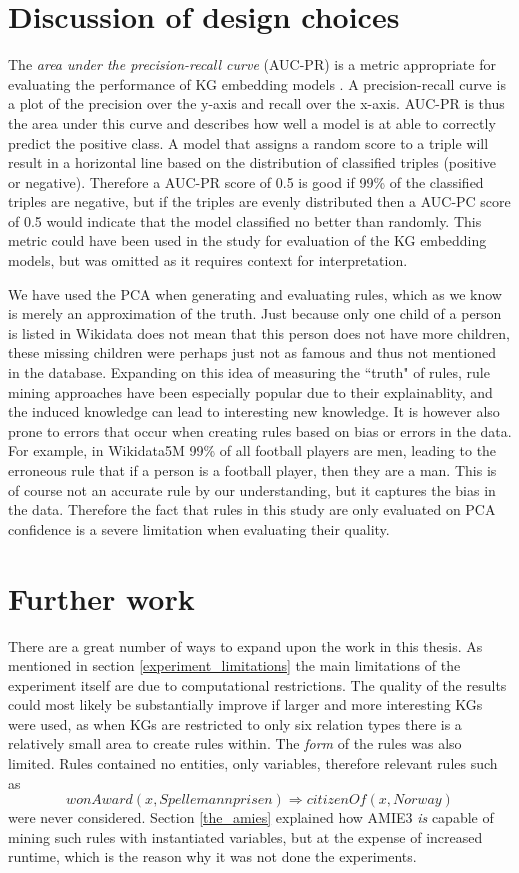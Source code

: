 \section{Discussion of design choices}
The \textit{area under the precision-recall curve} (AUC-PR) is a metric appropriate for evaluating the performance of KG embedding models \cite{jahn2021reasoning}. A precision-recall curve is a plot of the precision over the y-axis and recall over the x-axis. AUC-PR is thus the area under this curve and describes how well a model is at able to correctly predict the positive class. A model that assigns a random score to a triple will result in a horizontal line based on the distribution of classified triples (positive or negative). Therefore a AUC-PR score of 0.5 is good if 99\% of the classified triples are negative, but if the triples are evenly distributed then a AUC-PC score of 0.5 would indicate that the model classified no better than randomly. This metric could have been used in the study for evaluation of the KG embedding models, but was omitted as it requires context for interpretation.

We have used the PCA when generating and evaluating rules, which as we know is merely an approximation of the truth. Just because only one child of a person is listed in Wikidata does not mean that this person does not have more children, these missing children were perhaps just not as famous and thus not mentioned in the database. Expanding on this idea of measuring the ``truth" of rules, rule mining approaches have been especially popular due to their explainablity, and the induced knowledge can lead to interesting new knowledge. It is however also prone to errors that occur when creating rules based on bias or errors in the data. For example, in Wikidata5M 99\% of all football players are men, leading to the erroneous rule that if a person is a football player, then they are a man. This is of course not an accurate rule by our understanding, but it captures the bias in the data. Therefore the fact that rules in this study are only evaluated on PCA confidence is a severe limitation when evaluating their quality.

\section{Further work}
There are a great number of ways to expand upon the work in this thesis. As mentioned in section \ref{experiment_limitations} the main limitations of the experiment itself are due to computational restrictions. The quality of the results could most likely be substantially improve if larger and more interesting KGs were used, as when KGs are restricted to only six relation types there is a relatively small area to create rules within. The \textit{form} of the rules was also limited. Rules contained no entities, only variables, therefore relevant rules such as
\[wonAward(x, Spellemannprisen) \Rightarrow citizenOf(x, Norway)\]
were never considered. Section \ref{the_amies} explained how AMIE3 \textit{is} capable of mining such rules with instantiated variables, but at the expense of increased runtime, which is the reason why it was not done the experiments.

